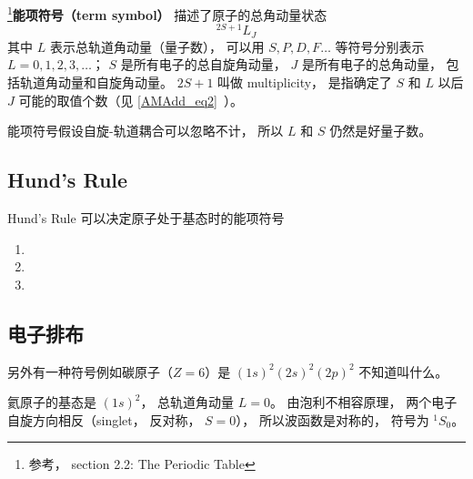 
\begin{issues}
\issueDraft
\end{issues}


\footnote{参考\cite{GriffQ}， section 2.2: The Periodic Table}\textbf{能项符号（term symbol）} 描述了原子的总角动量状态
\begin{equation}
^{2S + 1} L_J
\end{equation}
其中 $L$ 表示总轨道角动量（量子数）， 可以用 $S, P, D, F \dots$ 等符号分别表示 $L = 0, 1, 2, 3, \dots$； $S$ 是所有电子的总自旋角动量， $J$ 是所有电子的总角动量， 包括轨道角动量和自旋角动量。 $2S + 1$ 叫做 multiplicity， 是指确定了 $S$ 和 $L$ 以后 $J$ 可能的取值个数（见 \autoref{AMAdd_eq2}~）。

能项符号假设自旋-轨道耦合可以忽略不计， 所以 $L$ 和 $S$ 仍然是好量子数。

\subsection{Hund's Rule}
Hund's Rule 可以决定原子处于基态时的能项符号
\begin{enumerate}
\item 
\item 
\item 
\end{enumerate}

\subsection{电子排布}
另外有一种符号例如碳原子（$Z = 6$）是 $(1s)^2 (2s)^2 (2p)^2$ 不知道叫什么。

氦原子的基态是 $(1s)^2$， 总轨道角动量 $L = 0$。 由泡利不相容原理， 两个电子自旋方向相反（singlet， 反对称， $S = 0$）， 所以波函数是对称的， 符号为 $^1 S_0$。
